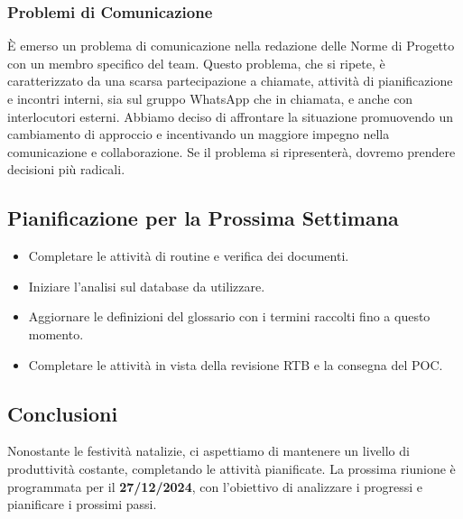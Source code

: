 \documentclass{article}
\newcommand{\isEsterno}{0}
\begin{document}
\subsubsection{Problemi di Comunicazione}
È emerso un problema di comunicazione nella redazione delle Norme di Progetto con un membro specifico del team. Questo problema, che si ripete, è caratterizzato da una scarsa partecipazione a chiamate, attività di pianificazione e incontri interni, sia sul gruppo WhatsApp che in chiamata, e anche con interlocutori esterni.  
Abbiamo deciso di affrontare la situazione promuovendo un cambiamento di approccio e incentivando un maggiore impegno nella comunicazione e collaborazione. Se il problema si ripresenterà, dovremo prendere decisioni più radicali.

\subsection{Pianificazione per la Prossima Settimana}
\begin{itemize}
    \item Completare le attività di routine e verifica dei documenti.
    \item Iniziare l'analisi sul database da utilizzare.
    \item Aggiornare le definizioni del glossario con i termini raccolti fino a questo momento.
    \item Completare le attività in vista della revisione RTB e la consegna del POC.
\end{itemize}

\subsection{Conclusioni}
Nonostante le festività natalizie, ci aspettiamo di mantenere un livello di produttività costante, completando le attività pianificate. La prossima riunione è programmata per il \textbf{27/12/2024}, con l'obiettivo di analizzare i progressi e pianificare i prossimi passi.





\ifthenelse{\equal{\isEsterno}{1}}{
    \begin{table}[b]
        \begin{tabular}{@{}p{.5in}p{4in}@{}}
            Data:  & \hrulefill \\
                   &     		\\
                   &     		\\
            Firma: & \hrulefill \\
        \end{tabular}
        \end{table}
}{}
\end{document}
